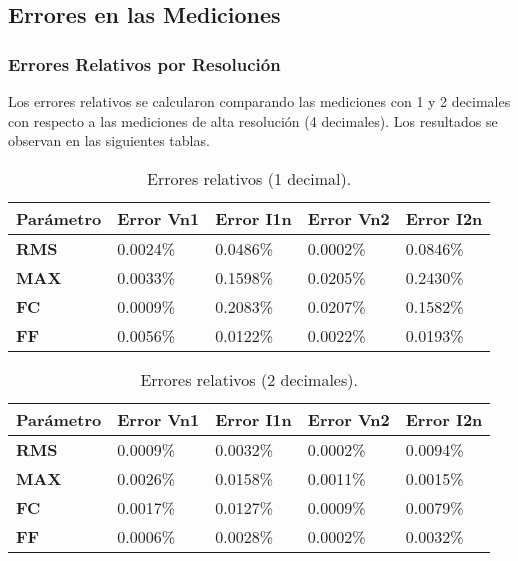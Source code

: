 \documentclass[conference]{IEEEtran}
\theoremstyle{mytheoremstyle}
\theoremstyle{mytheoremstyle}
\theoremstyle{myproblemstyle}
\begin{document}
        \subsection{Errores en las Mediciones}

        \subsubsection{Errores Relativos por Resolución}
        Los errores relativos se calcularon comparando las mediciones con 1 y 2 decimales con respecto a las mediciones de alta resolución (4 decimales). Los resultados se observan en las siguientes tablas.

        \begin{table}[H]
        \centering
        \caption{Errores relativos (1 decimal).}
        \label{tab:errores_1_decimal}
        \begin{tabular}{|l|l|l|l|l|}
        \hline
        \textbf{Parámetro} & \textbf{Error Vn1} & \textbf{Error I1n} & \textbf{Error Vn2} & \textbf{Error I2n} \\ \hline
        \textbf{RMS}       & 0.0024\%           & 0.0486\%           & 0.0002\%           & 0.0846\%           \\ \hline
        \textbf{MAX}       & 0.0033\%           & 0.1598\%           & 0.0205\%           & 0.2430\%           \\ \hline
        \textbf{FC}        & 0.0009\%           & 0.2083\%           & 0.0207\%           & 0.1582\%           \\ \hline
        \textbf{FF}        & 0.0056\%           & 0.0122\%           & 0.0022\%           & 0.0193\%           \\ \hline
        \end{tabular}
        \end{table}

        \begin{table}[H]
        \centering
        \caption{Errores relativos (2 decimales).}
        \label{tab:errores_2_decimales}
        \begin{tabular}{|l|l|l|l|l|}
        \hline
        \textbf{Parámetro} & \textbf{Error Vn1} & \textbf{Error I1n} & \textbf{Error Vn2} & \textbf{Error I2n} \\ \hline
        \textbf{RMS}       & 0.0009\%           & 0.0032\%           & 0.0002\%           & 0.0094\%           \\ \hline
        \textbf{MAX}       & 0.0026\%           & 0.0158\%           & 0.0011\%           & 0.0015\%           \\ \hline
        \textbf{FC}        & 0.0017\%           & 0.0127\%           & 0.0009\%           & 0.0079\%           \\ \hline
        \textbf{FF}        & 0.0006\%           & 0.0028\%           & 0.0002\%           & 0.0032\%           \\ \hline
        \end{tabular}
        \end{table}
\end{document}
